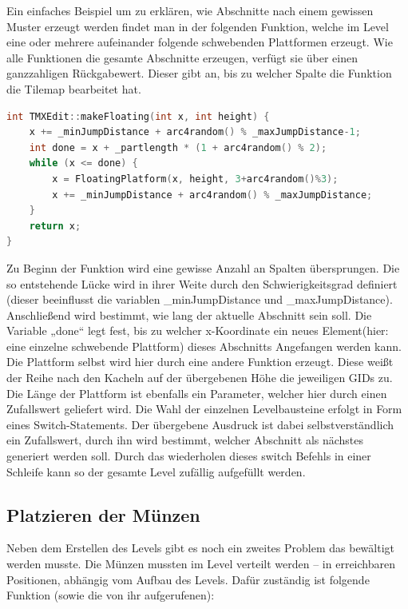 Ein einfaches Beispiel um zu erklären, wie Abschnitte nach einem gewissen Muster erzeugt werden findet man in der folgenden Funktion, welche im Level eine oder mehrere aufeinander folgende  schwebenden Plattformen erzeugt. Wie alle Funktionen die gesamte Abschnitte erzeugen, verfügt sie über einen ganzzahligen Rückgabewert. Dieser gibt an, bis zu welcher Spalte die Funktion die Tilemap bearbeitet hat.
\begin{lstlisting}[label=lst:make_floating,
				   language=C++,
				   firstnumber=171,
				   caption=Abschnitt mit schwebenden Plattformen erzeugen( TMXEdit.cpp )]
int TMXEdit::makeFloating(int x, int height) {
	x += _minJumpDistance + arc4random() % _maxJumpDistance-1;
	int done = x + _partlength * (1 + arc4random() % 2);
	while (x <= done) {
		x = FloatingPlatform(x, height, 3+arc4random()%3);
		x += _minJumpDistance + arc4random() % _maxJumpDistance;
	}
	return x;
}
\end{lstlisting}
Zu Beginn der Funktion wird eine gewisse Anzahl an Spalten übersprungen. Die so entstehende Lücke wird in ihrer Weite durch den Schwierigkeitsgrad definiert (dieser beeinflusst die variablen \_minJumpDistance und \_maxJumpDistance). Anschließend wird bestimmt, wie lang der aktuelle Abschnitt sein soll. Die Variable „done“ legt fest, bis zu welcher x-Koordinate ein neues Element(hier: eine einzelne schwebende Plattform) dieses Abschnitts Angefangen werden kann. Die Plattform selbst wird hier durch eine andere Funktion erzeugt. Diese weißt der Reihe nach den Kacheln auf der übergebenen Höhe die jeweiligen GIDs zu. Die Länge der Plattform ist ebenfalls ein Parameter, welcher hier durch einen Zufallswert geliefert wird. 
Die Wahl der einzelnen Levelbausteine erfolgt in Form eines Switch-Statements. Der übergebene Ausdruck ist dabei selbstverständlich ein Zufallswert, durch ihn wird bestimmt, welcher Abschnitt als nächstes generiert werden soll. Durch das wiederholen dieses switch Befehls in einer Schleife kann so der gesamte Level zufällig aufgefüllt werden.


\subsection{Platzieren der Münzen}
Neben dem Erstellen des Levels gibt es noch ein zweites Problem das bewältigt werden musste. Die Münzen mussten im Level verteilt werden – in erreichbaren Positionen, abhängig vom Aufbau des Levels.
Dafür zuständig ist folgende Funktion (sowie die von ihr aufgerufenen):

